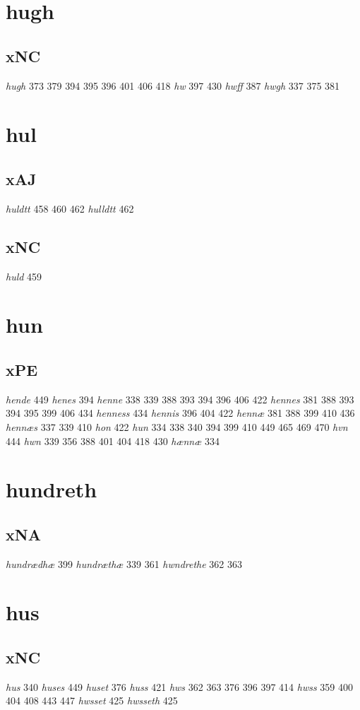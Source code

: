 \documentclass[a4paper,twocolumn]{article}
\begin{document}
\section{hugh}
\label{sec:org51b7782}
\subsection{xNC}
\label{sec:org882804b}
\emph{hugh} 373 379 394 395 396 401 406 418 \emph{hw} 397 430 \emph{hwff} 387 \emph{hwgh} 337 375 381 
\section{hul}
\label{sec:orgfed9133}
\subsection{xAJ}
\label{sec:orgaa078f3}
\emph{huldtt} 458 460 462 \emph{hulldtt} 462 
\subsection{xNC}
\label{sec:org51efde2}
\emph{huld} 459 
\section{hun}
\label{sec:orgc37ebdf}
\subsection{xPE}
\label{sec:orgbed337c}
\emph{hende} 449 \emph{henes} 394 \emph{henne} 338 339 388 393 394 396 406 422 \emph{hennes} 381 388 393 394 395 399 406 434 \emph{henness} 434 \emph{hennis} 396 404 422 \emph{hennæ} 381 388 399 410 436 \emph{hennæs} 337 339 410 \emph{hon} 422 \emph{hun} 334 338 340 394 399 410 449 465 469 470 \emph{hvn} 444 \emph{hwn} 339 356 388 401 404 418 430 \emph{hænnæ} 334 
\section{hundreth}
\label{sec:orge8d32fe}
\subsection{xNA}
\label{sec:org3246938}
\emph{hundrædhæ} 399 \emph{hundræthæ} 339 361 \emph{hwndrethe} 362 363 
\section{hus}
\label{sec:orge5e5c2c}
\subsection{xNC}
\label{sec:orgaee1220}
\emph{hus} 340 \emph{huses} 449 \emph{huset} 376 \emph{huss} 421 \emph{hws} 362 363 376 396 397 414 \emph{hwss} 359 400 404 408 443 447 \emph{hwsset} 425 \emph{hwsseth} 425 
\end{document}
